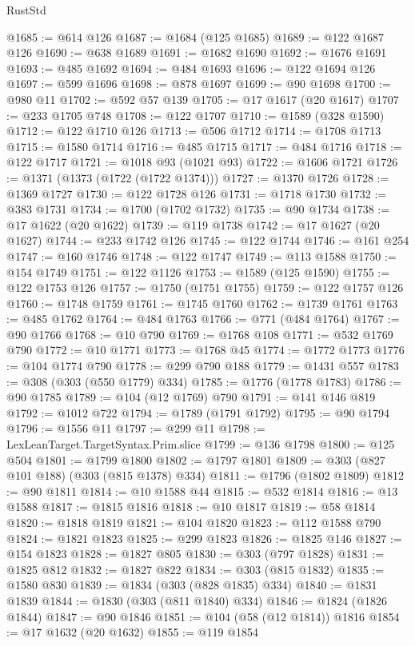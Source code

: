 \begin{lexlean}{RustStd}
\begin{coremodule}
{\begin{coremodule}
{{{{{{{{{{{{{{{{{{{{{{{{{{{{{{{{{{{{{{{{{{{{{{{{{{{{{{{{{{{{{{{{{{{{@1685 := @614 @126
@1687 := @1684 (@125 @1685)
@1689 := @122 @1687 @126
@1690 := @638 @1689
@1691 := @1682 @1690
@1692 := @1676 @1691
@1693 := @485 @1692
@1694 := @484 @1693
@1696 := @122 @1694 @126
@1697 := @599 @1696
@1698 := @878 @1697
@1699 := @90 @1698
@1700 := @980 @11
@1702 := @592 @57 @139
@1705 := @17 @1617 (@20 @1617)
@1707 := @233 @1705 @748
@1708 := @122 @1707
@1710 := @1589 (@328 @1590)
@1712 := @122 @1710 @126
@1713 := @506 @1712
@1714 := @1708 @1713
@1715 := @1580 @1714
@1716 := @485 @1715
@1717 := @484 @1716
@1718 := @122 @1717
@1721 := @1018 @93 (@1021 @93)
@1722 := @1606 @1721
@1726 := @1371 (@1373 (@1722 (@1722 @1374)))
@1727 := @1370 @1726
@1728 := @1369 @1727
@1730 := @122 @1728 @126
@1731 := @1718 @1730
@1732 := @383 @1731
@1734 := @1700 (@1702 @1732)
@1735 := @90 @1734
@1738 := @17 @1622 (@20 @1622)
@1739 := @119 @1738
@1742 := @17 @1627 (@20 @1627)
@1744 := @233 @1742 @126
@1745 := @122 @1744
@1746 := @161 @254
@1747 := @160 @1746
@1748 := @122 @1747
@1749 := @113 @1588
@1750 := @154 @1749
@1751 := @122 @1126
@1753 := @1589 (@125 @1590)
@1755 := @122 @1753 @126
@1757 := @1750 (@1751 @1755)
@1759 := @122 @1757 @126
@1760 := @1748 @1759
@1761 := @1745 @1760
@1762 := @1739 @1761
@1763 := @485 @1762
@1764 := @484 @1763
@1766 := @771 (@484 @1764)
@1767 := @90 @1766
@1768 := @10 @790
@1769 := @1768 @108
@1771 := @532 @1769 @790
@1772 := @10 @1771
@1773 := @1768 @45
@1774 := @1772 @1773
@1776 := @104 @1774 @790
@1778 := @299 @790 @188
@1779 := @1431 @557
@1783 := @308 (@303 (@550 @1779) @334)
@1785 := @1776 (@1778 @1783)
@1786 := @90 @1785
@1789 := @104 (@12 @1769) @790
@1791 := @141 @146 @819
@1792 := @1012 @722
@1794 := @1789 (@1791 @1792)
@1795 := @90 @1794
@1796 := @1556 @11
@1797 := @299 @11
@1798 := LexLeanTarget.TargetSyntax.Prim.slice
@1799 := @136 @1798
@1800 := @125 @504
@1801 := @1799 @1800
@1802 := @1797 @1801
@1809 := @303 (@827 @101 @188) (@303 (@815 @1378) @334)
@1811 := @1796 (@1802 @1809)
@1812 := @90 @1811
@1814 := @10 @1588 @44
@1815 := @532 @1814
@1816 := @13 @1588
@1817 := @1815 @1816
@1818 := @10 @1817
@1819 := @58 @1814
@1820 := @1818 @1819
@1821 := @104 @1820
@1823 := @112 @1588 @790
@1824 := @1821 @1823
@1825 := @299 @1823
@1826 := @1825 @146
@1827 := @154 @1823
@1828 := @1827 @805
@1830 := @303 (@797 @1828)
@1831 := @1825 @812
@1832 := @1827 @822
@1834 := @303 (@815 @1832)
@1835 := @1580 @830
@1839 := @1834 (@303 (@828 @1835) @334)
@1840 := @1831 @1839
@1844 := @1830 (@303 (@811 @1840) @334)
@1846 := @1824 (@1826 @1844)
@1847 := @90 @1846
@1851 := @104 (@58 (@12 @1814)) @1816
@1854 := @17 @1632 (@20 @1632)
@1855 := @119 @1854
}}}}}}}}}}}}}}}}}}}}}}}}}}}}}}}}}}}}}}}}}}}}}}}}}}}}}}}}}}}}}}}}}}}}
\end{coremodule}}
\end{coremodule}
\end{lexlean}
